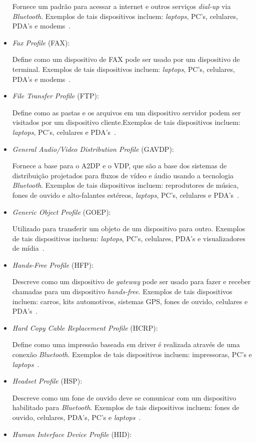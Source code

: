 \begin{itemize}
	Fornece um padrão para acessar a internet e outros serviços \emph{dial-up} via \emph{Bluetooth}. Exemplos de tais dispositivos incluem: \emph{laptops}, PC's, celulares, PDA's e modems~\cite{bluetoothprofilesDUN}.
	\item \emph{Fax Profile} (FAX): 

	Define como um dispositivo de FAX pode ser usado por um dispositivo de terminal. Exemplos de tais dispositivos incluem: \emph{laptops}, PC's, celulares, PDA's e modems~\cite{bluetoothprofilesFAX}.
	\item \emph{File Transfer Profile} (FTP): 

	Define como as pastas e os arquivos em um dispositivo servidor podem ser visitados por um dispositivo cliente.Exemplos de tais dispositivos incluem: \emph{laptops}, PC's, celulares e PDA's~\cite{bluetoothprofilesFTP}.
	\item \emph{General Audio/Video Distribution Profile} (GAVDP): 

	Fornece a base para o A2DP e o VDP, que são a base dos sistemas de distribuição projetados para fluxos de vídeo e áudio usando a tecnologia \emph{Bluetooth}. Exemplos de tais dispositivos incluem: reprodutores de música, fones de ouvido e alto-falantes estéreos, \emph{laptops}, PC's, celulares e PDA's~\cite{bluetoothprofilesGAVDP}.
	\item \emph{Generic Object Profile} (GOEP): 

	Utilizado para transferir um objeto de um dispositivo para outro. Exemplos de tais dispositivos incluem: \emph{laptops}, PC's, celulares, PDA's e visualizadores de mídia~\cite{bluetoothprofilesGOEP}.
	\item \emph{Hands-Free Profile} (HFP): 

	Descreve como um dispositivo de \emph{gateway} pode ser usado para fazer e receber chamadas para um dispositivo \emph{hands-free}. Exemplos de tais dispositivos incluem: carros, kits automotivos, sistemas GPS, fones de ouvido, celulares e PDA's~\cite{bluetoothprofilesHFP}.
	\item \emph{Hard Copy Cable Replacement Profile} (HCRP): 

	Define como uma impressão baseada em driver é realizada através de uma conexão \emph{Bluetooth}. Exemplos de tais dispositivos incluem: impressoras, PC's e \emph{laptops}~\cite{bluetoothprofilesHCRP}.
	\item \emph{Headset Profile} (HSP): 

	Descreve como um fone de ouvido deve se comunicar com um dispositivo habilitado para \emph{Bluetooth}. Exemplos de tais dispositivos incluem: fones de ouvido, celulares, PDA's, PC's e \emph{laptops}~\cite{bluetoothprofilesHSP}.
	\item \emph{Human Interface Device Profile} (HID): 


\end{itemize}
